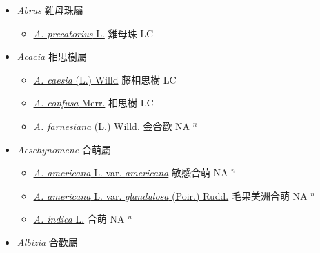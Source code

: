 
  \begin{itemize}
 \item[] \textit{Abrus} 雞母珠屬
                    
  \begin{itemize}
        \item[] \href{http://www.theplantlist.org/tpl1.1/search?q=Abrus+precatorius}{\textit{A. precatorius} L.}   雞母珠 LC
  \end{itemize}
 \item[] \textit{Acacia} 相思樹屬
                    
  \begin{itemize}
        \item[] \href{http://www.theplantlist.org/tpl1.1/search?q=Acacia+caesia}{\textit{A. caesia} (L.) Willd}   藤相思樹 LC
        \item[] \href{http://www.theplantlist.org/tpl1.1/search?q=Acacia+confusa}{\textit{A. confusa} Merr.}   相思樹 LC
        \item[] \href{http://www.theplantlist.org/tpl1.1/search?q=Acacia+farnesiana}{\textit{A. farnesiana} (L.) Willd.}   金合歡 NA $^n$
  \end{itemize}
 \item[] \textit{Aeschynomene} 合萌屬
                    
  \begin{itemize}
        \item[] \href{http://www.theplantlist.org/tpl1.1/search?q=Aeschynomene+americana+var.+americana}{\textit{A. americana} L. var. \textit{americana}}   敏感合萌 NA $^n$
        \item[] \href{http://www.theplantlist.org/tpl1.1/search?q=Aeschynomene+americana+var.+glandulosa}{\textit{A. americana} L. var. \textit{glandulosa} (Poir.) Rudd.}   毛果美洲合萌 NA $^n$
        \item[] \href{http://www.theplantlist.org/tpl1.1/search?q=Aeschynomene+indica}{\textit{A. indica} L.}   合萌 NA $^n$
  \end{itemize}
 \item[] \textit{Albizia} 合歡屬
                    

\end{itemize}
